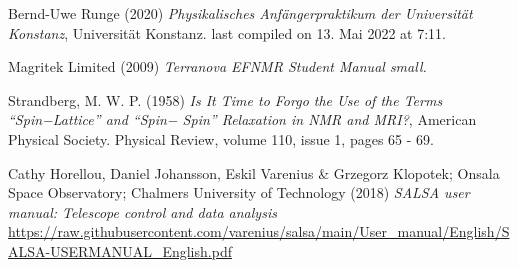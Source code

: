 \documentclass[../main.tex]{subfiles}
\begin{document}
	\begin{thebibliography}{99}
		 Bernd-Uwe Runge (2020) \emph{Physikalisches Anfängerpraktikum der Universität Konstanz}, Universität Konstanz. last compiled on 13. Mai 2022 at 7:11. 

         Magritek Limited (2009)
        \emph{Terranova EFNMR Student Manual small.}

         Strandberg, M. W. P. (1958) \emph{Is It Time to Forgo the Use of the Terms “Spin−Lattice” and “Spin− Spin” Relaxation in NMR and MRI?}, American Physical Society. Physical Review, volume 110, issue 1, pages 65 - 69. 

         Cathy Horellou, Daniel Johansson, Eskil Varenius \& Grzegorz Klopotek; Onsala Space Observatory; Chalmers University of Technology (2018)
        \emph{SALSA user manual: Telescope control and data analysis}
        \url{https://raw.githubusercontent.com/varenius/salsa/main/User_manual/English/SALSA-USERMANUAL_English.pdf}



  
		
	\end{thebibliography}
\end{document}
